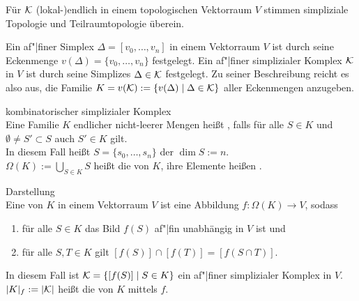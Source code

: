 \begin{Bem}
    Für $\mathcal{K}$ (lokal-)endlich in einem topologischen Vektorraum $V$ stimmen
    simpliziale Topologie und Teilraumtopologie überein.
\end{Bem}

\linie

\begin{Bem}
    Ein af"|finer Simplex $\Delta = [v_0, \dotsc, v_n]$ in einem Vektorraum $V$
    ist durch seine Eckenmenge $v(\Delta) = \{v_0, \dotsc, v_n\}$ festgelegt.
    Ein af"|finer simplizialer Komplex $\mathcal{K}$ in $V$ ist durch seine Simplizes
    $\Delta \in \mathcal{K}$ festgelegt.
    Zu seiner Beschreibung reicht es also aus, die Familie
    $K = v(\mathcal{K}) := \{v(\Delta) \;|\; \Delta \in \mathcal{K}\}$
    aller Eckenmengen anzugeben.
\end{Bem}

\begin{Def}{kombinatorischer simplizialer Komplex}\\
    Eine Familie $K$ endlicher nicht-leerer Mengen heißt
    ,
    falls für alle $S \in K$ und $\emptyset \not= S' \subset S$ auch
    $S' \in K$ gilt. \\
    In diesem Fall heißt $S = \{s_0, \dotsc, s_n\}$
    der  $\dim S := n$. \\
    $\Omega(K) := \bigcup_{S \in K} S$ heißt die  von $K$,
    ihre Elemente heißen .
\end{Def}

\linie

\begin{Def}{Darstellung}\\
    Eine  von $K$ in einem Vektorraum $V$ ist
    eine Abbildung $f\colon \Omega(K) \rightarrow V$, sodass
    \begin{enumerate}
        \item
        für alle $S \in K$ das Bild $f(S)$ af"|fin unabhängig in $V$ ist und

        \item
        für alle $S, T \in K$ gilt $[f(S)] \cap [f(T)] = [f(S \cap T)]$.
    \end{enumerate}
    In diesem Fall ist $\mathcal{K} = \{[f(S)] \;|\; S \in K\}$
    ein af"|finer simplizialer Komplex in $V$. \\
    $|K|_f := |\mathcal{K}|$ heißt die  von $K$
    mittels $f$.
\end{Def}

